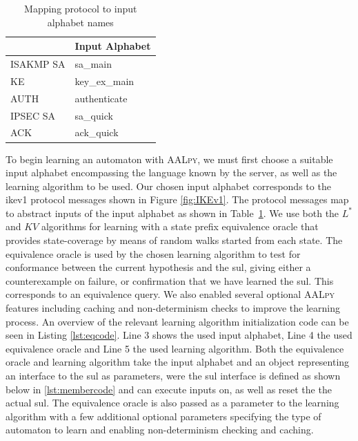\begin{table}[h]
	\centering
	\begin{tabular}{|l|l|}
		\hline
		\rowcolor[HTML]{DAE8FC} 
		\hline
		\multicolumn{1}{|l|}{\cellcolor[HTML]{DAE8FC}\textbf{Protocol}} & \multicolumn{1}{l|}{\cellcolor[HTML]{DAE8FC}\textbf{Input Alphabet}} \\ \hline
		ISAKMP SA                                                       & sa\_main                                                             \\
		KE                                                              & key\_ex\_main                                                        \\
		AUTH                                                            & authenticate                                                         \\
		IPSEC SA                                                        & sa\_quick                                                            \\
		ACK                                                             & ack\_quick                                                           \\ \hline
	\end{tabular}
	\caption{Mapping protocol to input alphabet names}
	\label{tab:map_prot_ia}
\end{table}

To begin learning an automaton with \textsc{AALpy}, we must first choose a suitable input alphabet encompassing the language known by the server, as well as the learning algorithm to be used. Our chosen input alphabet corresponds to the \ac{ike}v1 protocol messages shown in Figure \ref{fig:IKEv1}. The protocol messages map to abstract inputs of the input alphabet as shown in Table~\ref{tab:map_prot_ia}. We use both the $L^*$ and $KV$ algorithms for learning with a state prefix equivalence oracle that provides state-coverage by means of random walks started from each state. The equivalence oracle is used by the chosen learning algorithm to test for conformance between the current hypothesis and the \ac{sul}, giving either a counterexample on failure, or confirmation that we have learned the \ac{sul}. This corresponds to an equivalence query. We also enabled several optional \textsc{AALpy} features including caching and non-determinism checks to improve the learning process. An overview of the relevant learning algorithm initialization code can be seen in Listing \ref{lst:eqcode}. Line 3 shows the used input alphabet, Line 4 the used equivalence oracle and Line 5 the used learning algorithm. Both the equivalence oracle and learning algorithm take the input alphabet and an object representing an interface to the \ac{sul} as parameters, were the \ac{sul} interface is defined as shown below in \ref{lst:membercode} and can execute inputs on, as well as reset the the actual \ac{sul}. The equivalence oracle is also passed as a parameter to the learning algorithm with a few additional optional parameters specifying the type of automaton to learn and enabling non-determinism checking and caching.

